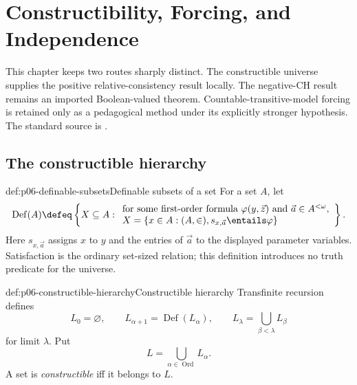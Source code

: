 
\chapter{Constructibility, Forcing, and Independence}
\label{sec:p06-constructibility-forcing}

This chapter keeps two routes sharply distinct.  The constructible universe
supplies the positive relative-consistency result locally.  The negative-CH
result remains an imported Boolean-valued theorem.  Countable-transitive-model
forcing is retained only as a pedagogical method under its explicitly stronger
hypothesis.  The standard source is \cite{Jech2003}.



\section{The constructible hierarchy}
\label{sec:p06-constructible-hierarchy}

\begin{hbdefinition}{def:p06-definable-subsets}{Definable subsets of a set}
For a set \(A\), let
\[
  \operatorname{Def}(A)
  \defeq
  \left\{X\subseteq A:
    \begin{array}{l}
      \text{for some first-order formula }\varphi(y,\vec z)
      \text{ and }\vec a\in A^{<\omega},\\
      X=\{x\in A:(A,\in),s_{x,\vec a}\entails\varphi\}
    \end{array}
  \right\}.
\]
Here \(s_{x,\vec a}\) assigns \(x\) to \(y\) and the entries of
\(\vec a\) to the displayed parameter variables.  Satisfaction is the
ordinary set-sized relation; this definition introduces no truth predicate
for the universe.
\end{hbdefinition}

\begin{hbdefinition}{def:p06-constructible-hierarchy}{Constructible hierarchy}
Transfinite recursion defines
\[
  L_0=\varnothing,\qquad
  L_{\alpha+1}=\operatorname{Def}(L_\alpha),\qquad
  L_\lambda=\bigcup_{\beta<\lambda}L_\beta
\]
for limit \(\lambda\).  Put
\[
  L=\bigcup_{\alpha\in\operatorname{Ord}}L_\alpha.
\]
A set is \emph{constructible} iff it belongs to \(L\).
\end{hbdefinition}


